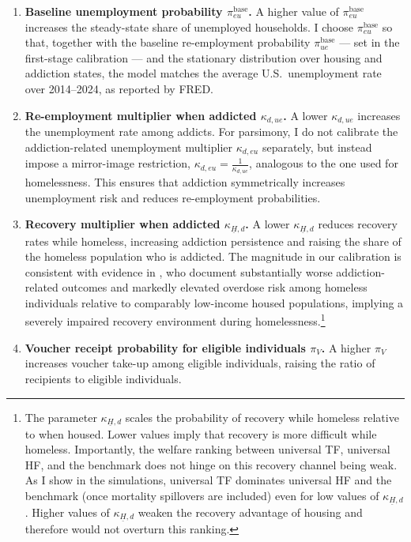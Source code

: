 \documentclass[parskip=full]{article}
\theoremstyle{plain}
\theoremstyle{definition}
\theoremstyle{remark}
\begin{document}
\begin{enumerate}
\item \textbf{Baseline unemployment probability $\pi_{eu}^{\text{base}}$.} A higher value of $\pi_{eu}^{\text{base}}$ increases the steady-state share of unemployed households. I choose $\pi_{eu}^{\text{base}}$ so that, together with the baseline re-employment probability $\pi_{ue}^{\text{base}}$ — set in the first-stage calibration — and the stationary distribution over housing and addiction states, the model matches the average U.S.\ unemployment rate over 2014--2024, as reported by FRED.

\item \textbf{Re-employment multiplier when addicted $\kappa_{d,ue}$.} A lower $\kappa_{d,ue}$ increases the unemployment rate among addicts. For parsimony, I do not calibrate the addiction-related unemployment multiplier $\kappa_{d,eu}$ separately, but instead impose a mirror-image restriction, $\kappa_{d,eu}=\frac{1}{\kappa_{d,ue}}$, analogous to the one used for homelessness. This ensures that addiction symmetrically increases unemployment risk and reduces re-employment probabilities.

\item \textbf{Recovery multiplier when addicted $\kappa_{\underline H,d}$.} A lower $\kappa_{\underline H,d}$ reduces recovery rates while homeless, increasing addiction persistence and raising the share of the homeless population who is addicted. The magnitude in our calibration is consistent with evidence in \citet{yamamoto2019homelessness}, who document substantially worse addiction-related outcomes and markedly elevated overdose risk among homeless individuals relative to comparably low-income housed populations, implying a severely impaired recovery environment during homelessness.\footnote{The parameter $\kappa_{\underline H,d}$ scales the probability of recovery while homeless relative to when housed. Lower values imply that recovery is more difficult while homeless. Importantly, the welfare ranking between universal TF, universal HF, and the benchmark does not hinge on this recovery channel being weak. As I show in the simulations, universal TF dominates universal HF and the benchmark (once mortality spillovers are included) even for low values of $\kappa_{\underline H,d}$. Higher values of $\kappa_{\underline H,d}$ weaken the recovery advantage of housing and therefore would not overturn this ranking.}

\item \textbf{Voucher receipt probability for eligible individuals $\pi_V$.} A higher $\pi_V$ increases voucher take-up among eligible individuals, raising the ratio of recipients to eligible individuals.


\end{enumerate}
\end{document}
